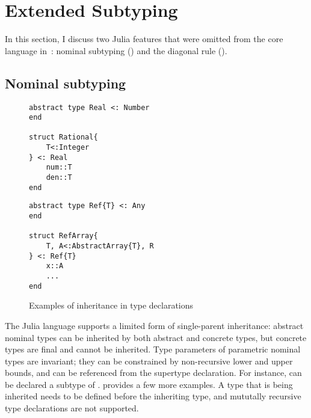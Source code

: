 \section{Extended Subtyping}\label{sec:dec-sub:ext}

In this section, I discuss two Julia features that were
omitted from the core language in~:
nominal subtyping () and
the diagonal rule ().

\subsection{Nominal subtyping}\label{subsec:dec-sub:inheritance}

\begin{figure}[t] 
\begin{minipage}{5cm}
\begin{lstlisting}
abstract type Real <: Number
end

struct Rational{
    T<:Integer
} <: Real
    num::T
    den::T
end
\end{lstlisting}
\end{minipage}
\hspace{1cm}
\begin{minipage}{5cm}
\begin{lstlisting}
abstract type Ref{T} <: Any
end

struct RefArray{
    T, A<:AbstractArray{T}, R
} <: Ref{T}
    x::A
    ...
end
\end{lstlisting}  
\end{minipage}
\caption{Examples of inheritance in type declarations
}\label{fig:code:inheritance}
\end{figure}

The Julia language supports a limited form of single-parent inheritance:
abstract nominal types can be inherited by both abstract and concrete
types, but concrete types are final and cannot be inherited.
Type parameters of parametric nominal types are invariant;
they can be constrained by non-recursive lower and upper bounds,
and can be referenced from the supertype declaration.
For instance,  can be declared a subtype of
.
 provides a few more examples.
A type that is being inherited needs to be defined before the inheriting type,
and mututally recursive type declarations are not supported.

